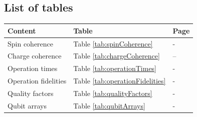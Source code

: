 \documentclass[aps, prx, showpacs, twocolumn, superscriptaddress, notitlepage, longbibliography, floatfix, nofootinbib]{revtex4-2}
\begin{document}
\begin{widetext}

\let\table\tablehere
\let\endtable\endtablehere




\section{List of tables}

\label{app:tables}

\vspace{1cm}

\begin{table}[h!]
\Large
\begin{center}
\begin{tabular}{l@{\quad}ll}
\toprule
Content & Table & Page\\
\midrule
Spin coherence & Table \ref{tab:spinCoherence} & \pageref{spinCoherence1}-\pageref{spinCoherence8}\\
Charge coherence & Table \ref{tab:chargeCoherence} & \pageref{chargeCoherence1}--\pageref{chargeCoherence2}\\
Operation times & Table \ref{tab:operationTimes} & \pageref{operationTime1}-\pageref{operationTime5}\\
Operation fidelities & Table \ref{tab:operationFidelities} & \pageref{operationFidelity1}-\pageref{operationFidelity5}\\
Quality factors & Table \ref{tab:qualityFactors} & \pageref{qualityFactorMerged1}-\pageref{qualityFactorMerged2}\\
Qubit arrays & Table \ref{tab:qubitArrays} & \pageref{qubitArray1}-\pageref{qubitArray2}\\
\bottomrule
\end{tabular}
\end{center}
\end{table}

\vspace{1cm}




\renewcommand{\theHtable}{\arabic{table}.\arabic{subtable}}

\setcounter{subtable}{0} \addtocounter{table}{-1}\label{tab:spinCoherence}
\renewcommand\thetable{\Roman{table}-\arabic{subtable}}
\setcounter{subtable}{1}


\addtocounter{table}{-1}
\addtocounter{subtable}{+1}


\end{widetext}
\end{document}
